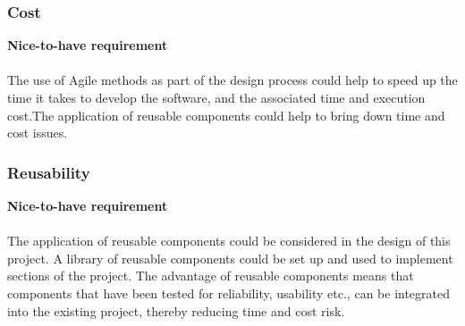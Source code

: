\documentclass[a4paper]{article}
\begin{document}
\subsubsection{Cost}
\textbf{Nice-to-have requirement}
\\
\\The use of Agile methods as part of the design process could help to speed up the time it takes to develop the software, and the associated time and execution cost.The application of reusable components could help to bring down time and cost issues. 

\subsubsection{Reusability }
\textbf{Nice-to-have requirement}
\\
\\The application of reusable components could be considered in the design of this project. A library of reusable components could be set up and used to implement sections of the project. The advantage of reusable components means that components that have been tested for reliability, usability etc., can be integrated into the existing project, thereby reducing time and cost risk.
\end{document}
